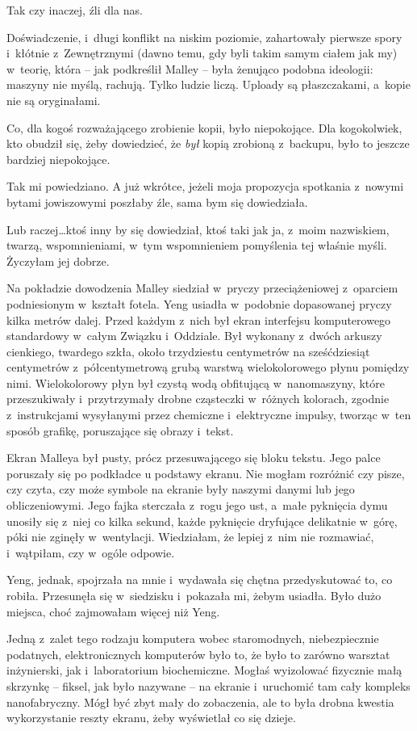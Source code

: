 \documentclass[oneside,polish,11pt,sfheadings]{mwbk}
\begin{document}
Tak czy inaczej, źli dla nas.

Doświadczenie, i~długi konflikt na niskim poziomie, zahartowały pierwsze
spory i~kłótnie z~Zewnętrznymi (dawno temu, gdy byli takim samym ciałem
jak my) w~teorię, która -- jak podkreślił Malley -- była żenująco podobna
ideologii: maszyny nie myślą, rachują. Tylko ludzie liczą. Uploady są
płaszczakami, a~kopie nie są oryginałami.

Co, dla kogoś rozważającego zrobienie kopii, było niepokojące. Dla
kogokolwiek, kto obudził się, żeby dowiedzieć, że \textit{był} kopią
zrobioną z~backupu, było to jeszcze bardziej niepokojące.

Tak mi powiedziano. A już wkrótce, jeżeli moja propozycja spotkania z~nowymi bytami jowiszowymi poszłaby źle, sama bym się dowiedziała.

Lub raczej\ldots  ktoś inny by się dowiedział, ktoś taki jak ja, z~moim
nazwiskiem, twarzą, wspomnieniami, w~tym wspomnieniem pomyślenia tej
właśnie myśli. Życzyłam jej dobrze.

Na pokładzie dowodzenia Malley siedział w~pryczy przeciążeniowej z~oparciem podniesionym w~kształt fotela. Yeng usiadła w~podobnie
dopasowanej pryczy kilka metrów dalej. Przed każdym z~nich był ekran
interfejsu komputerowego standardowy w~całym Związku i~Oddziale. Był
wykonany z~dwóch arkuszy cienkiego, twardego szkła, około trzydziestu
centymetrów na sześćdziesiąt centymetrów z~półcentymetrową grubą warstwą
wielokolorowego płynu pomiędzy nimi. Wielokolorowy płyn był czystą wodą
obfitującą w~nanomaszyny, które przeszukiwały i~przytrzymały drobne
cząsteczki w~różnych kolorach, zgodnie z~instrukcjami wysyłanymi przez
chemiczne i~elektryczne impulsy, tworząc w~ten sposób grafikę,
poruszające się obrazy i~tekst.

Ekran Malleya był pusty, prócz przesuwającego się bloku tekstu. Jego
palce poruszały się po podkładce u podstawy ekranu. Nie mogłam rozróżnić
czy pisze, czy czyta, czy może symbole na ekranie były naszymi danymi
lub jego obliczeniowymi. Jego fajka sterczała z~rogu jego ust, a~małe
pyknięcia dymu unosiły się z~niej co kilka sekund, każde pyknięcie
dryfujące delikatnie w~górę, póki nie zginęły w~wentylacji. Wiedziałam,
że lepiej z~nim nie rozmawiać, i~wątpiłam, czy w~ogóle odpowie.

Yeng, jednak, spojrzała na mnie i~wydawała się chętna przedyskutować to,
co robiła. Przesunęła się w~siedzisku i~pokazała mi, żebym usiadła. Było
dużo miejsca, choć zajmowałam więcej niż Yeng.

Jedną z~zalet tego rodzaju komputera wobec staromodnych, niebezpiecznie
podatnych, elektronicznych komputerów było to, że było to zarówno
warsztat inżynierski, jak i~laboratorium biochemiczne. Mogłaś wyizolować
fizycznie małą skrzynkę -- fiksel, jak było nazywane -- na ekranie i~uruchomić tam cały kompleks nanofabryczny. Mógł być zbyt mały do
zobaczenia, ale to była drobna kwestia wykorzystanie reszty ekranu, żeby
wyświetlał co się dzieje.
\end{document}
